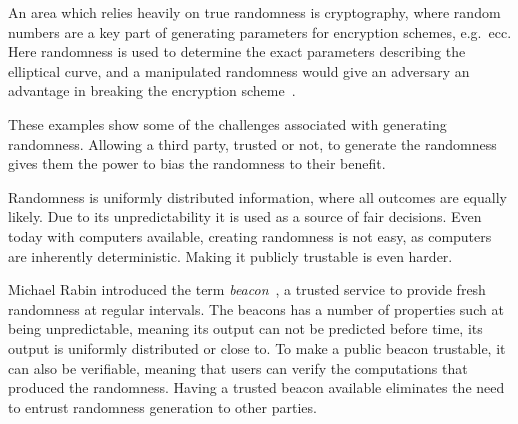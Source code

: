 An area which relies heavily on true randomness is cryptography, where random numbers are a key part of generating parameters for encryption schemes, e.g.\ \gls{ecc}.
Here randomness is used to determine the exact parameters describing the elliptical curve, and a manipulated randomness would give an adversary an advantage in breaking the encryption scheme~\cite{bernstein2015manipulate}.


These examples show some of the challenges associated with generating randomness. Allowing a third party, trusted or not, to generate the randomness gives them the power to bias the randomness to their benefit.

Randomness is uniformly distributed information, where all outcomes are equally likely. Due to its unpredictability it is used as a source of fair decisions. Even today with computers available, creating randomness is not easy, as computers are inherently deterministic. Making it publicly trustable is even harder. 

Michael Rabin introduced the term \emph{beacon}~\cite{rabin1983transaction}, a trusted service to provide fresh randomness at regular intervals. The beacons has a number of properties such at being unpredictable, meaning its output can not be predicted before time, its output is uniformly distributed or close to. To make a public beacon trustable, it can also be verifiable, meaning that users can verify the computations that produced the randomness. 
Having a trusted beacon available eliminates the need to entrust randomness generation to other parties.

